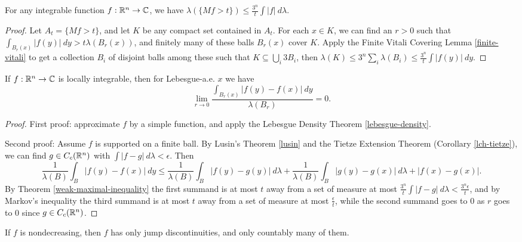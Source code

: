 \begin{thm}\label{weak-maximal-inequality} For any integrable function $f : \mathbb{R}^n \rightarrow \mathbb{C}$, we have $\lambda(\{Mf > t\}) \le \frac{3^n}{t}\int |f|\ d\lambda$.
\end{thm}
\begin{proof} Let $A_t = \{Mf > t\}$, and let $K$ be any compact set contained in $A_t$. For each $x \in K$, we can find an $r > 0$ such that $\int_{B_r(x)} |f(y)|\ dy > t\lambda(B_r(x))$, and finitely many of these balls $B_r(x)$ cover $K$. Apply the Finite Vitali Covering Lemma \ref{finite-vitali} to get a collection $B_i$ of disjoint balls among these such that $K \subseteq \bigcup_i 3B_i$, then $\lambda(K) \le 3^n\sum_i \lambda(B_i) \le \frac{3^n}{t} \int |f(y)|\ dy$.
\end{proof}


\begin{thm}\label{lebesgue-differentiation} If $f : \mathbb{R}^n \rightarrow \mathbb{C}$ is locally integrable, then for Lebesgue-a.e. $x$ we have
\[
\lim_{r \rightarrow 0} \frac{\int_{B_r(x)} |f(y)-f(x)|\ dy}{\lambda(B_r)} = 0.
\]
\end{thm}
\begin{proof} First proof: approximate $f$ by a simple function, and apply the Lebesgue Density Theorem \ref{lebesgue-density}.

Second proof: Assume $f$ is supported on a finite ball. By Lusin's Theorem \ref{lusin} and the Tietze Extension Theorem (Corollary \ref{lch-tietze}), we can find $g \in C_c(\mathbb{R}^n)$ with $\int |f-g|\ d\lambda < \epsilon$. Then
\[
\frac{1}{\lambda(B)}\int_{B} |f(y)-f(x)|\ dy \le \frac{1}{\lambda(B)}\int_B |f(y) - g(y)|\ d\lambda + \frac{1}{\lambda(B)}\int_B |g(y) - g(x)|\ d\lambda + |f(x) - g(x)|.
\]
By Theorem \ref{weak-maximal-inequality} the first summand is at most $t$ away from a set of measure at most $\frac{3^n}{t} \int |f-g|\ d\lambda < \frac{3^n\epsilon}{t}$, and by Markov's inequality the third summand is at most $t$ away from a set of measure at most $\frac{\epsilon}{t}$, while the second summand goes to $0$ as $r$ goes to $0$ since $g \in C_c(\mathbb{R}^n)$.
\end{proof}

\begin{prop} If $f$ is nondecreasing, then $f$ has only jump discontinuities, and only countably many of them.
\end{prop}


